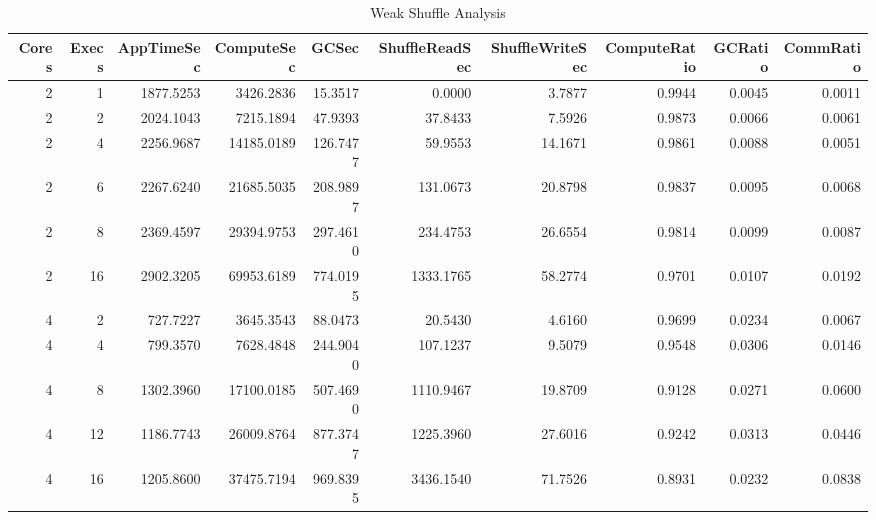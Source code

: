 \begin{table}
\caption{Weak Shuffle Analysis}
\label{tab:table10_weak_shuffle_table}
\begin{tabular}{rrrrrrrrrr}
\toprule
Cores & Execs & AppTimeSec & ComputeSec & GCSec & ShuffleReadSec & ShuffleWriteSec & ComputeRatio & GCRatio & CommRatio \\
\midrule
2 & 1 & 1877.5253 & 3426.2836 & 15.3517 & 0.0000 & 3.7877 & 0.9944 & 0.0045 & 0.0011 \\
2 & 2 & 2024.1043 & 7215.1894 & 47.9393 & 37.8433 & 7.5926 & 0.9873 & 0.0066 & 0.0061 \\
2 & 4 & 2256.9687 & 14185.0189 & 126.7477 & 59.9553 & 14.1671 & 0.9861 & 0.0088 & 0.0051 \\
2 & 6 & 2267.6240 & 21685.5035 & 208.9897 & 131.0673 & 20.8798 & 0.9837 & 0.0095 & 0.0068 \\
2 & 8 & 2369.4597 & 29394.9753 & 297.4610 & 234.4753 & 26.6554 & 0.9814 & 0.0099 & 0.0087 \\
2 & 16 & 2902.3205 & 69953.6189 & 774.0195 & 1333.1765 & 58.2774 & 0.9701 & 0.0107 & 0.0192 \\
4 & 2 & 727.7227 & 3645.3543 & 88.0473 & 20.5430 & 4.6160 & 0.9699 & 0.0234 & 0.0067 \\
4 & 4 & 799.3570 & 7628.4848 & 244.9040 & 107.1237 & 9.5079 & 0.9548 & 0.0306 & 0.0146 \\
4 & 8 & 1302.3960 & 17100.0185 & 507.4690 & 1110.9467 & 19.8709 & 0.9128 & 0.0271 & 0.0600 \\
4 & 12 & 1186.7743 & 26009.8764 & 877.3747 & 1225.3960 & 27.6016 & 0.9242 & 0.0313 & 0.0446 \\
4 & 16 & 1205.8600 & 37475.7194 & 969.8395 & 3436.1540 & 71.7526 & 0.8931 & 0.0232 & 0.0838 \\
\bottomrule
\end{tabular}
\end{table}
